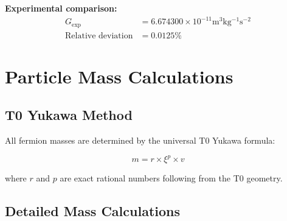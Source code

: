 \documentclass[12pt,a4paper]{report}
\begin{document}
	\textbf{Experimental comparison:}
	\begin{align}
		G_{\text{exp}} &= 6.674300 \times 10^{-11} \si{\meter^3 \kilogram^{-1} \second^{-2}} \\
		\text{Relative deviation} &= 0.0125\%
	\end{align}
	
	\section{Particle Mass Calculations}
	
	\subsection{T0 Yukawa Method}
	
	All fermion masses are determined by the universal T0 Yukawa formula:
	
	\begin{equation}
		\boxed{m = r \times \xi^p \times v}
	\end{equation}
	
	where $r$ and $p$ are exact rational numbers following from the T0 geometry.
	
	\subsection{Detailed Mass Calculations}
	
\end{document}

